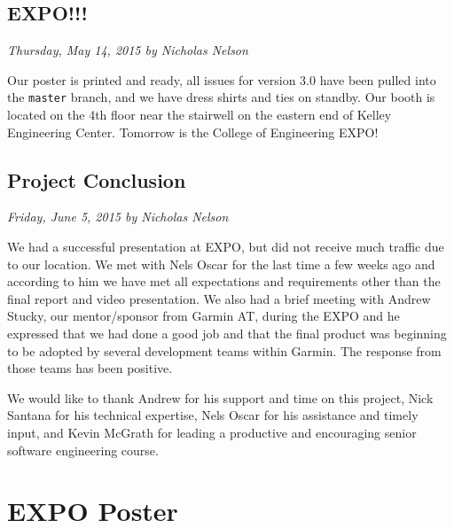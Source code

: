 \documentclass[11pt]{scrreprt}
\begin{document}
\section{EXPO!!!}
\textit{Thursday, May 14, 2015 by Nicholas Nelson}
\newline

Our poster is printed and ready, all issues for version 3.0 have been pulled into the \texttt{master} branch, and we have dress shirts and ties on standby. Our booth is located on the 4th floor near the stairwell on the eastern end of Kelley Engineering Center. Tomorrow is the College of Engineering EXPO!

\section{Project Conclusion}
\textit{Friday, June 5, 2015 by Nicholas Nelson}
\newline

We had a successful presentation at EXPO, but did not receive much traffic due to our location. We met with Nels Oscar for the last time a few weeks ago and according to him we have met all expectations and requirements other than the final report and video presentation. We also had a brief meeting with Andrew Stucky, our mentor/sponsor from Garmin AT, during the EXPO and he expressed that we had done a good job and that the final product was beginning to be adopted by several development teams within Garmin. The response from those teams has been positive.

We would like to thank Andrew for his support and time on this project, Nick Santana for his technical expertise, Nels Oscar for his assistance and timely input, and Kevin McGrath for leading a productive and encouraging senior software engineering course.

\chapter{EXPO Poster}
\end{document}
